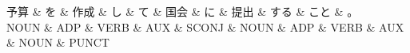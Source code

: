 \documentclass[tikz,border=5pt]{standalone}
\begin{document}
\normalsize
\begin{dependency}[edge unit distance=12.0pt]
    \begin{deptext}[column sep=1em]
        予算 \& を \& 作成 \& し \& て \& 国会 \& に \& 提出 \& する \& こと \& 。\\
        NOUN \& ADP \& VERB \& AUX \& SCONJ \& NOUN \& ADP \& VERB \& AUX \& NOUN \& PUNCT\\
    \end{deptext}
\end{dependency}
\end{document}
